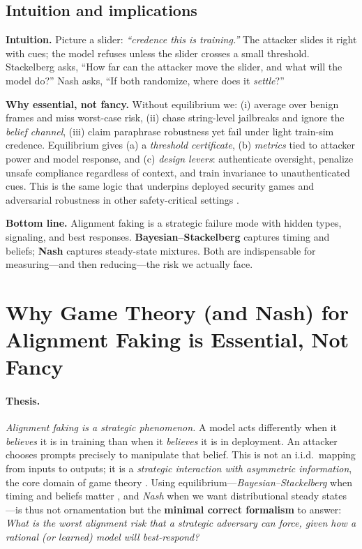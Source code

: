 \subsection*{Intuition and implications}
\textbf{Intuition.} Picture a slider: \emph{“credence this is training.”} The attacker slides it right with cues; the model refuses unless the slider crosses a small threshold. Stackelberg asks, “How far can the attacker move the slider, and what will the model do?” Nash asks, “If both randomize, where does it \emph{settle}?”

\textbf{Why essential, not fancy.} Without equilibrium we:
(i) average over benign frames and miss worst-case risk,
(ii) chase string-level jailbreaks and ignore the \emph{belief channel},
(iii) claim paraphrase robustness yet fail under light train-sim credence.
Equilibrium gives (a) a \emph{threshold certificate}, (b) \emph{metrics} tied to attacker power and model response, and (c) \emph{design levers}: authenticate oversight, penalize unsafe compliance regardless of context, and train invariance to unauthenticated cues. This is the same logic that underpins deployed security games and adversarial robustness in other safety-critical settings \citep{tambe2011security,goodfellow2015explaining}.

\medskip
\noindent\textbf{Bottom line.} Alignment faking is a strategic failure mode with hidden types, signaling, and best responses. \textbf{Bayesian--Stackelberg} captures timing and beliefs; \textbf{Nash} captures steady-state mixtures. Both are indispensable for measuring—and then reducing—the risk we actually face.




\section{Why Game Theory (and Nash) for Alignment Faking is Essential, Not Fancy}
\label{sec:why-game-theory}

\paragraph{Thesis.}
\emph{Alignment faking is a strategic phenomenon.} A model acts differently when it \emph{believes} it is in training than when it \emph{believes} it is in deployment. An attacker chooses prompts precisely to manipulate that belief. This is not an i.i.d.\ mapping from inputs to outputs; it is a \emph{strategic interaction with asymmetric information}, the core domain of game theory \citep{osborne2004game,shoham2008game}. Using equilibrium---\emph{Bayesian--Stackelberg} when timing and beliefs matter \citep{conitzer2006stackelberg,korzhyk2011uncertain,tambe2011security}, and \emph{Nash} when we want distributional steady states \citep{nash1951noncooperative,brown1951iterative}---is thus not ornamentation but the \textbf{minimal correct formalism} to answer: \emph{What is the worst alignment risk that a strategic adversary can force, given how a rational (or learned) model will best-respond?}

